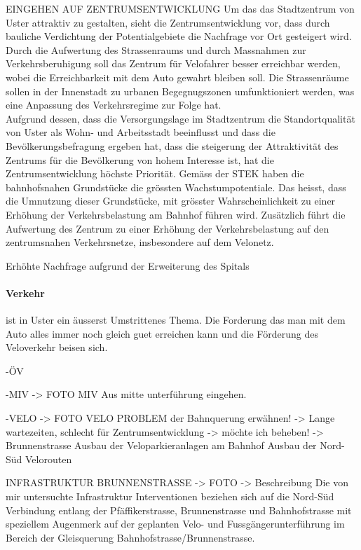 EINGEHEN AUF ZENTRUMSENTWICKLUNG
Um das das Stadtzentrum von Uster attraktiv zu gestalten, sieht die Zentrumsentwicklung vor, dass durch bauliche Verdichtung der Potentialgebiete die Nachfrage vor Ort gesteigert wird. Durch die Aufwertung des Strassenraums und durch Massnahmen zur Verkehrsberuhigung soll das Zentrum für Velofahrer besser erreichbar werden, wobei die Erreichbarkeit mit dem Auto gewahrt bleiben soll. Die Strassenräume sollen in der Innenstadt zu urbanen Begegnugszonen umfunktioniert werden, was eine Anpassung des Verkehrsregime zur Folge hat. \\
Aufgrund dessen, dass die Versorgungslage im Stadtzentrum die Standortqualität von Uster als Wohn- und Arbeitsstadt beeinflusst und dass die Bevölkerungsbefragung ergeben hat, dass die steigerung der Attraktivität des Zentrums für die Bevölkerung von hohem Interesse ist, hat die Zentrumsentwicklung höchste Priorität.
Gemäss der STEK haben die bahnhofsnahen Grundstücke die grössten Wachstumpotentiale. Das heisst, dass die Umnutzung dieser Grundstücke, mit grösster Wahrscheinlichkeit zu einer Erhöhung der Verkehrsbelastung am Bahnhof führen wird. Zusätzlich führt die Aufwertung des Zentrum zu einer Erhöhung der Verkehrsbelastung auf den zentrumsnahen Verkehrsnetze, insbesondere auf dem Velonetz.

Erhöhte Nachfrage aufgrund der Erweiterung des Spitals
 
\paragraph{Verkehr} ist in Uster ein äusserst Umstrittenes Thema. Die Forderung das man mit dem Auto alles immer noch gleich guet erreichen kann und die Förderung des Veloverkehr beisen sich. 

 -ÖV
 
 -MIV
 	-> FOTO MIV
 	Aus mitte unterführung eingehen.
 	
 -VELO
 	-> FOTO VELO
	PROBLEM der Bahnquerung erwähnen! -> Lange wartezeiten, schlecht für Zentrumsentwicklung -> möchte ich beheben! -> Brunnenstrasse
	Ausbau der Veloparkieranlagen am Bahnhof
	 Ausbau der Nord-Süd Velorouten 

INFRASTRUKTUR BRUNNENSTRASSE
-> FOTO 
-> Beschreibung
Die von mir untersuchte Infrastruktur Interventionen beziehen sich auf die Nord-Süd Verbindung
entlang der Pfäffikerstrasse, Brunnenstrasse und Bahnhofstrasse mit speziellem Augenmerk auf der geplanten Velo- und Fussgängerunterführung im Bereich der Gleisquerung Bahnhofstrasse/Brunnenstrasse. 



